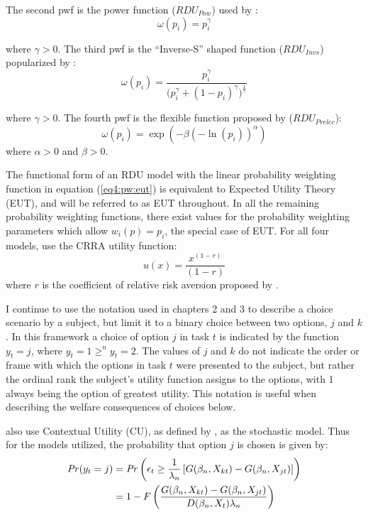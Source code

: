 \documentclass[../main.tex]{subfiles}
\begin{document}
\noindent The second pwf is the power function ($\mathit{RDU_{Pow}}$) used by \textcite{Quiggin1982}:
\begin{equation}
	\label{eq4:pw:pow}
	\omega(p_i)=p_i^\gamma
\end{equation}

\noindent where $\gamma > 0$. 
The third pwf is the \enquote{Inverse-S} shaped function ($\mathit{RDU_{Invs}}$) popularized by \textcite{Tversky1992}:
\begin{equation}
	\label{eq4:pw:inv}
	\omega(p_i) = \frac{p_i^\gamma}{\biggl(p_i^\gamma + {(1-p_i)}^\gamma\biggr)^{ \frac{1}{\gamma} } }
\end{equation}

\noindent where $\gamma > 0$. 
The fourth pwf is the flexible function proposed by \textcite{Prelec1998} ($\mathit{RDU_{Prelec}}$):
\begin{equation}
	\label{eq4:pw:pre}
	\omega(p_i)=\exp(-\beta(-\ln(p_i))^\alpha)
\end{equation}
\noindent where $\alpha > 0$ and $\beta > 0$.

The functional form of an RDU model with the linear probability weighting function in equation (\ref{eq4:pw:eut}) is equivalent to Expected Utility Theory (EUT), and will be referred to as EUT throughout.
In all the remaining probability weighting functions, there exist values for the probability weighting parameters which allow $w_i(p) = p_i$, the special case of EUT.
For all four models, \textcite{Harrison2016} use the CRRA utility function:
\begin{equation}
	\label{eq4:CRRA}
	u(x) = \frac{x^{(1-r)}}{(1-r)}
\end{equation}
\noindent where $r$ is the coefficient of relative risk aversion proposed by \textcite{Pratt1964}.

I continue to use the notation used in chapters 2 and 3 to describe a choice scenario by a subject, but limit it to a binary choice between two options, $j$ and $k$.
In this framework a choice of option $j$ in task $t$ is indicated by the function $y_t = j$, where $y_t = 1 \geq^n y_t = 2$.
The values of $j$ and $k$ do not indicate the order or frame with which the options in task $t$ were presented to the subject, but rather the ordinal rank the subject's utility function assigns to the options, with 1 always being the option of greatest utility.
This notation is useful when describing the welfare consequences of choices below.

\textcite{Harrison2016} also use Contextual Utility (CU), as defined by \textcite{Wilcox2008}, as the stochastic model.
Thus for the models utilized, the probability that option $j$ is chosen is given by:
\begin{align}
	\label{eq4:RE.2}
	\begin{split}
		{\ensuremath{\mathit{Pr}}}(y_t = j) &= {\mathit{Pr}}\left(  \epsilon_t \geq \frac{1}{\lambda_n} \left[ G(\beta_n,X_{kt}) - G(\beta_n,X_{jt}) \right] \right)\\
		&= 1 - F\left( \dfrac{G(\beta_n,X_{kt}) - G(\beta_n,X_{jt})}{D(\beta_n,X_t)\lambda_n }  \right)
	\end{split}
\end{align}
\end{document}
